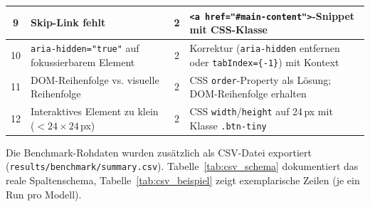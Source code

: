 \begin{table}[htbp]
\begin{tabular}{|c|p{4.8cm}|c|p{5.2cm}|}
\hline
9 & Skip-Link fehlt & 2 & \texttt{<a href="\#main-content">}-Snippet mit \ac{CSS}-Klasse \\
\hline
10 & \texttt{aria-hidden="true"} auf fokussierbarem Element & 2 & Korrektur (\texttt{aria-hidden} entfernen oder \texttt{tabIndex=\{-1\}}) mit Kontext \\
\hline
11 & \ac{DOM}-Reihenfolge vs. visuelle Reihenfolge & 2 & \ac{CSS} \texttt{order}-Property als Lösung; \ac{DOM}-Reihenfolge erhalten \\
\hline
12 & Interaktives Element zu klein ($<24\times24$\,px) & 2 & \ac{CSS} \texttt{width}/\texttt{height} auf 24\,px mit Klasse \texttt{.btn-tiny} \\
\hline
\end{tabular}
\label{tab:empfehlungsqualitaet}
\end{table}

\clearpage

\label{app:csv_export_12}

Die Benchmark-Rohdaten wurden zusätzlich als CSV-Datei exportiert (\texttt{results\-/bench\-mark\-/summary.csv}). Tabelle~\ref{tab:csv_schema} dokumentiert das reale Spaltenschema, Tabelle~\ref{tab:csv_beispiel} zeigt exemplarische Zeilen (je ein Run pro Modell).

\begin{table}[htbp]
\centering
\setlength{\tabcolsep}{4pt}
\renewcommand{\arraystretch}{1.2}
\caption[CSV-Spaltenschema]{Spaltenschema des CSV-Exports \texttt{results/benchmark/summary.csv}.}
%
\label{tab:csv_schema}
\end{table}

